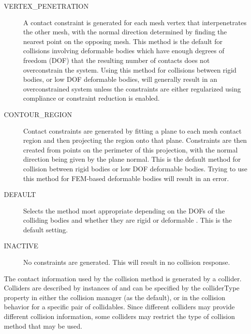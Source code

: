 \begin{description}

\item[VERTEX\_PENETRATION]\mbox{}

A contact constraint is generated for each mesh vertex that
interpenetrates the other mesh, with the normal direction determined
by finding the nearest point on the opposing mesh.  This method is the
default for collisions involving deformable bodies which have enough
degrees of freedom (DOF) that the resulting number of contacts does
not overconstrain the system.  Using this method for collisions
between rigid bodies, or low DOF deformable bodies, will generally
result in an overconstrained system unless the constraints are either
regularized using compliance or constraint reduction is enabled.

\item[CONTOUR\_REGION]\mbox{}

Contact constraints are generated by fitting a plane to each mesh
contact region and then projecting the region onto that plane.
Constraints are then created from points on the perimeter of this
projection, with the normal direction being given by the plane
normal. This is the default method for collision between rigid bodies
or low DOF deformable bodies. Trying to use this method for FEM-based
deformable bodies will result in an error.

\item[DEFAULT]\mbox{}

Selects the method most appropriate depending on the DOFs of the
colliding bodies and whether they are rigid or deformable . This is
the default setting.

\item[INACTIVE]\mbox{}

No constraints are generated. This will result in no collision
response.

\end{description}

The contact information used by the collision method is generated by a
collider. Colliders are described by instances of
and can be specified by the {\sf colliderType} property in either the
collision manager (as the default), or in the collision behavior for a
specific pair of collidables. Since different colliders may provide
different collision information, some colliders may restrict the type
of collision method that may be used.

